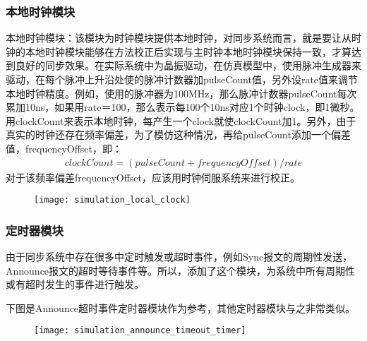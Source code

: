 \subsubsection{本地时钟模块}
本地时钟模块：该模块为时钟模块提供本地时钟，对同步系统而言，就是要让从时钟的本地时钟模块能够在方法校正后实现与主时钟本地时钟模块保持一致，才算达到良好的同步效果。在实际系统中为晶振驱动，在仿真模型中，使用脉冲生成器来驱动，在每个脉冲上升沿处使的脉冲计数器加pulseCount值，另外设rate值来调节本地时钟精度。例如，使用的脉冲器为100MHz，那么脉冲计数器pulseCount每次累加10ns，如果用rate＝100，那么表示每100个10ns对应1个时钟clock，即1微秒。用clockCount来表示本地时钟，每产生一个clock就使clockCount加1。另外，由于真实的时钟还存在频率偏差，为了模仿这种情况，再给pulseCount添加一个偏差值，frequencyOffset，即：
\begin{align}
  clockCount = (pulseCount + frequencyOffset) / rate
\end{align}
对于该频率偏差frequencyOffset，应该用时钟伺服系统来进行校正。
\begin{figure}[!hbp]
  \centering
  \begin{minipage}[b]{1\textwidth}
    \captionstyle{\centering}
    \centering
    \texttt{[image: simulation\_local\_clock]}
  \end{minipage}     
\end{figure}

\subsubsection{定时器模块}
由于同步系统中存在很多中定时触发或超时事件，例如Sync报文的周期性发送，Announce报文的超时等待事件等。所以，添加了这个模块，为系统中所有周期性或有超时发生的事件进行触发。

下图是Announce超时事件定时器模块作为参考，其他定时器模块与之非常类似。
\begin{figure}[!hbp]
  \centering
  \begin{minipage}[b]{1\textwidth}
    \captionstyle{\centering}
    \centering
    \texttt{[image: simulation\_announce\_timeout\_timer]}
  \end{minipage}     
\end{figure}

